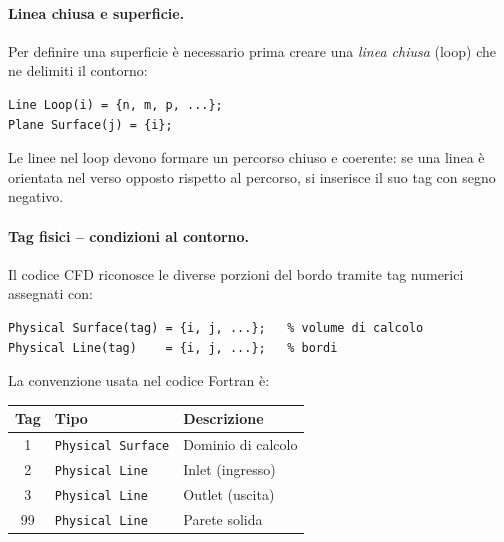 \paragraph{Linea chiusa e superficie.}
Per definire una superficie è necessario prima creare una \emph{linea chiusa} (loop) che
ne delimiti il contorno:
\begin{lstlisting}[style=gmsh]
Line Loop(i) = {n, m, p, ...};
Plane Surface(j) = {i};
\end{lstlisting}
Le linee nel loop devono formare un percorso chiuso e coerente: se una linea è orientata nel
verso opposto rispetto al percorso, si inserisce il suo tag con segno negativo.

\paragraph{Tag fisici -- condizioni al contorno.}
Il codice CFD riconosce le diverse porzioni del bordo tramite tag numerici assegnati con:
\begin{lstlisting}[style=gmsh]
Physical Surface(tag) = {i, j, ...};   % volume di calcolo
Physical Line(tag)    = {i, j, ...};   % bordi
\end{lstlisting}
La convenzione usata nel codice Fortran è:
\begin{center}
\begin{tabular}{cll}
  \toprule
  Tag & Tipo & Descrizione \\
  \midrule
  1  & \texttt{Physical Surface} & Dominio di calcolo \\
  2  & \texttt{Physical Line}    & Inlet (ingresso) \\
  3  & \texttt{Physical Line}    & Outlet (uscita) \\
  99 & \texttt{Physical Line}    & Parete solida \\
  \bottomrule
\end{tabular}
\end{center}

